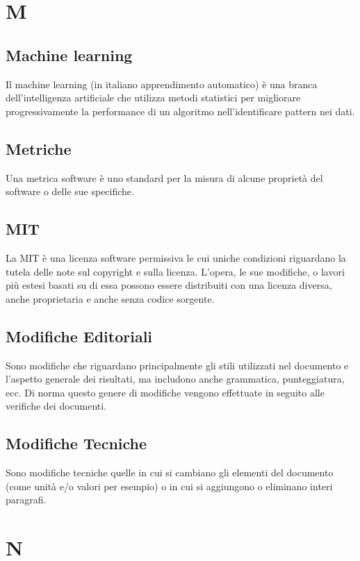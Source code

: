 \clearpage
\section*{M}

\subsection*{Machine learning}
Il machine learning (in italiano apprendimento automatico) è una branca dell'intelligenza artificiale che utilizza metodi statistici per migliorare progressivamente la performance di un algoritmo nell'identificare pattern nei dati. 

\subsection*{Metriche}
Una metrica software è uno standard per la misura di alcune proprietà del software o delle sue specifiche. 

\subsection*{MIT}
La MIT è una licenza software permissiva le cui uniche condizioni riguardano la tutela delle note sul copyright e sulla licenza. L'opera, le sue modifiche, o lavori più estesi basati su di essa possono essere distribuiti con una licenza diversa, anche proprietaria e anche senza codice sorgente. 

\subsection*{Modifiche Editoriali}
Sono modifiche che riguardano principalmente gli stili utilizzati nel documento e l'aspetto generale dei risultati, ma includono anche grammatica, punteggiatura, ecc. Di norma questo genere di modifiche vengono effettuate in seguito alle verifiche dei documenti.

\subsection*{Modifiche Tecniche}
Sono modifiche tecniche quelle in cui si cambiano gli elementi del documento (come unità e/o valori per esempio) o in cui si aggiungono o eliminano interi paragrafi.

\clearpage
\section*{N}

